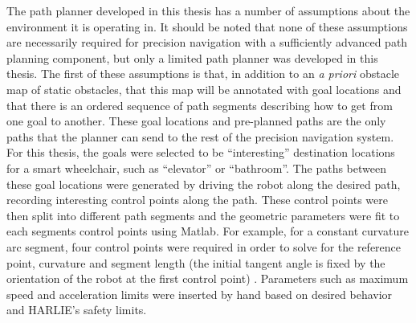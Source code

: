 The path planner developed in this thesis has a number of assumptions about the environment it is operating in. It should be noted that none of these assumptions are necessarily required for precision navigation with a sufficiently advanced path planning component, but only a limited path planner was developed in this thesis. The first of these assumptions is that, in addition to an \emph{a priori} obstacle map of static obstacles, that this map will be annotated with goal locations and that there is an ordered sequence of path segments describing how to get from one goal to another. These goal locations and pre-planned paths are the only paths that the planner can send to the rest of the precision navigation system. For this thesis, the goals were selected to be ``interesting'' destination locations for a smart wheelchair, such as ``elevator'' or ``bathroom''. The paths between these goal locations were generated by driving the robot along the desired path, recording interesting control points along the path. These control points were then split into different path segments and the geometric parameters were fit to each segments control points using Matlab. For example, for a constant curvature arc segment, four control points were required in order to solve for the reference point, curvature and segment length (the initial tangent angle is fixed by the orientation of the robot at the first control point) . Parameters such as maximum speed and acceleration limits were inserted by hand based on desired behavior and HARLIE's safety limits.

